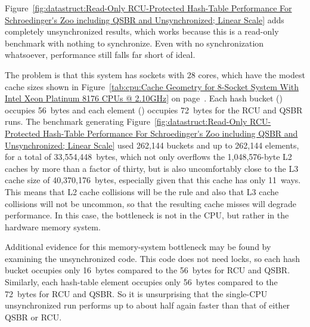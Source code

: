 Figure~\ref{fig:datastruct:Read-Only RCU-Protected Hash-Table Performance For Schroedinger's Zoo including QSBR and Unsynchronized; Linear Scale}
adds completely unsynchronized results, which works because this
is a read-only benchmark with nothing to synchronize.
Even with no synchronization whatsoever, performance still falls far
short of ideal.

The problem is that this system has sockets with 28 cores, which have
the modest cache sizes shown in
Figure~\ref{tab:cpu:Cache Geometry for 8-Socket System With Intel Xeon Platinum 8176 CPUs @ 2.10GHz}
on page~\pageref{tab:cpu:Cache Geometry for 8-Socket System With Intel Xeon Platinum 8176 CPUs @ 2.10GHz}.
Each hash bucket () occupies 56~bytes and each
element () occupies 72~bytes for the RCU and QSBR runs.
The benchmark generating
Figure~\ref{fig:datastruct:Read-Only RCU-Protected Hash-Table Performance For Schroedinger's Zoo including QSBR and Unsynchronized; Linear Scale}
used 262,144 buckets and up to 262,144 elements, for a total of
33,554,448~bytes, which not only overflows the 1,048,576-byte L2 caches
by more than a factor of thirty, but is also uncomfortably close to the
L3 cache size of 40,370,176~bytes, especially given that this cache has
only 11~ways.
This means that L2 cache collisions will be the rule and also that L3
cache collisions will not be uncommon, so that the resulting cache misses
will degrade performance.
In this case, the bottleneck is not in the CPU, but rather in the hardware
memory system.

Additional evidence for this memory-system bottleneck may be found by
examining the unsynchronized code.
This code does not need locks, so each hash bucket occupies only 16~bytes
compared to the 56~bytes for RCU and QSBR\@.
Similarly, each hash-table element occupies only 56~bytes compared to the
72~bytes for RCU and QSBR\@.
So it is unsurprising that the single-CPU unsynchronized run performs up
to about half again faster than that of either QSBR or RCU\@.

